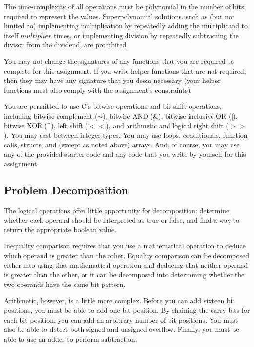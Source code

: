 The time-complexity of all operations must be polynomial in the number of bits required to represent the values.
Superpolynomial solutions, such as (but not limited to) implementing multiplication by repeatedly adding the multiplicand to itself $multiplier$ times, or implementing division by repeatedly subtracting the divisor from the dividend, are prohibited.

You may not change the signatures of any functions that you are required to complete for this assignment.
If you write helper functions that are not required, then they may have any signature that you deem necessary
(your helper functions must also comply with the assignment's constraints).

You are permitted to use C's bitwise operations and bit shift operations, including bitwise complement ($\sim$), bitwise AND (\&), bitwise inclusive OR ($|$), bitwise XOR (\^{}), left shift ($<<$), and arithmetic and logical right shift ($>>$).
You may cast between integer types.
You may use loops, conditionals, function calls, structs, and (except as noted above) arrays.
And, of course, you may use any of the provided starter code and any code that you write by yourself for this assignment.


    \subsection{Problem Decomposition}

    The logical operations offer little opportunity for decomposition: determine whether each operand should be interpreted as true or false, and find a way to return the appropriate boolean value.

    Inequality comparison requires that you use a mathematical operation to deduce which operand is greater than the other.
    Equality comparison can be decomposed either into using that mathematical operation and deducing that neither operand is greater than the other, or it can be decomposed into determining whether the two operands have the same bit pattern.

    Arithmetic, however, is a little more complex.
    Before you can add sixteen bit positions, you must be able to add one bit position.
    By chaining the carry bits for each bit position, you can add an arbitrary number of bit positions.
    You must also be able to detect both signed and unsigned overflow.
    Finally, you must be able to use an adder to perform subtraction.

